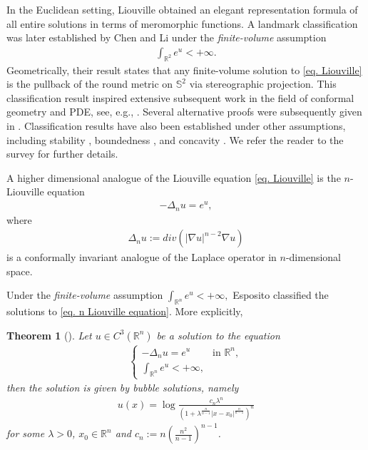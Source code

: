 \documentclass[12pt]{amsart}
\theoremstyle{plain}
\newtheorem{theorem}{Theorem}[section]
\theoremstyle{definition}
\theoremstyle{remark}     %
\begin{document}
 In the Euclidean setting, Liouville \cite{Lio1853} obtained an elegant representation formula of all entire solutions 
  in terms of meromorphic functions.
 A landmark classification was later established by Chen and Li \cite{CL91} under the \emph{finite-volume} assumption
 \begin{align*}
     \int_{\mathbb{R}^2}e^{u}<+\infty.
 \end{align*}
 Geometrically,  their result states that
  any finite-volume solution to \cref{eq. Liouville} is the pullback of the round metric on $\mathbb{S}^2$ via stereographic projection.
  This classification result  inspired extensive subsequent work in the field of conformal geometry and PDE, see, e.g., \cite{CL97, Lin98, CK00, CW01, CLO06}.
 Several alternative proofs were subsequently given in \cite{CW94, CK95, JW02,  BLdS04, HW06, LT20}. 
 Classification results  have also been established  under other assumptions, including stability \cite{Far07}, boundedness \cite{EGLX25}, and concavity \cite{BEL23}.
 We refer the reader to the survey \cite{CL24survey} for further details.

 A higher dimensional analogue of the Liouville equation \cref{eq. Liouville} is the $n$-Liouville equation
 \begin{align}\label{eq. n Liouville equation}
     -\Delta_n u=e^{u},
 \end{align}
 where 
 \begin{align*}
     \Delta_n u:=div(|\nabla u|^{n-2}\nabla u)
 \end{align*}
 is a conformally invariant analogue of the Laplace operator in $n$-dimensional space.
 
 Under the \emph{finite-volume} assumption $\int_{\mathbb{R}^n}e^{u}<+\infty,$
 Esposito \cite[Theorem 1.1]{Esp18} classified the solutions to \cref{eq. n Liouville equation}. More explicitly,
 \begin{theorem}[\cite{Esp18}]\label{thm. Esposito 18}
     Let $u\in C^3(\mathbb{R}^n)$ be a solution to the equation
     \begin{align*}
     \begin{cases}
         -\Delta_n u=e^u &\text{in }\mathbb{R}^n,\\
         \int_{\mathbb{R}^n}e^u<+\infty,
     \end{cases}
     \end{align*}
     then the solution is given by bubble solutions, namely
     \begin{align}\label{eq. bubble solution}
         u(x)=\log \frac{c_n\lambda^n}
         {\left(1+\lambda^{\frac{n}{n-1}}|x-x_0|^{\frac{n}{n-1}}\right)^n}
     \end{align}
     for some $\lambda>0$, $x_0\in\mathbb{R}^n$ and $c_n:=n(\frac{n^2}{n-1})^{n-1}$.
 \end{theorem}
 
\end{document}
